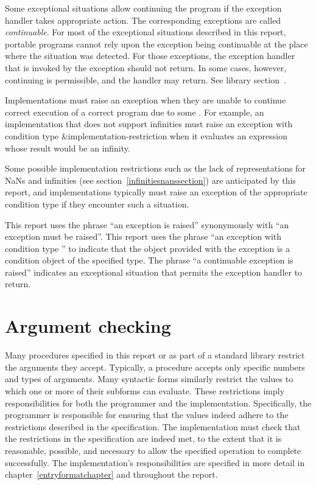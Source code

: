 Some exceptional situations allow continuing the program if the
exception handler takes appropriate action.  The corresponding
exceptions are called \textit{continuable}.
For most of the exceptional situations described in this report,
portable programs cannot rely upon the exception being continuable
at the place where the situation was detected.
For those exceptions, the exception handler that is invoked by the
exception should not return.
In some cases, however, continuing is permissible, and the
handler may return.  See library section~.

Implementations must raise an exception
when they are unable to continue correct execution
of a correct program due to some .  For
example, an implementation that does not support infinities
must raise an exception with condition type
{\cf\&implementation-restriction} when it evaluates an expression
whose result would be an infinity.

Some possible implementation restrictions such as the lack of
representations for NaNs and infinities (see
section~\ref{infinitiesnanssection}) are anticipated by this report,
and implementations typically must raise an exception of the
appropriate condition type if they encounter such a situation.

This report uses the phrase ``an exception is raised'' synonymously
with ``an exception must be raised''.
This report uses the phrase ``an exception with condition type ''
to indicate that the object provided with the
exception is a condition object of the specified type.
The phrase ``a continuable exception is raised'' indicates an
exceptional situation that permits the exception handler to return.

\section{Argument checking}
\label{argumentcheckingsection}

Many procedures specified in this report or as part of a
standard library restrict the arguments they accept.
Typically, a procedure accepts only specific numbers and types of arguments.
Many syntactic forms similarly restrict the values to which one or
more of their subforms can evaluate.
These restrictions imply responsibilities for
both the programmer and the implementation.
Specifically, the programmer is responsible for ensuring
that the values indeed adhere to the restrictions described
in the specification.  The implementation must check
that the restrictions in the specification are indeed met, to the
extent that it is reasonable, possible, and necessary to allow the
specified operation to complete successfully.  The implementation's
responsibilities are specified in more detail in
chapter~\ref{entryformatchapter} and throughout the report.

